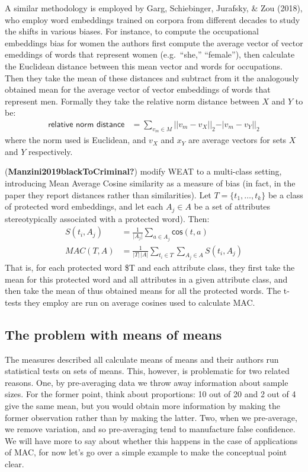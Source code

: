\documentclass[
  10pt,
  dvipsnames,enabledeprecatedfontcommands]{scrartcl}
\begin{document}
A similar methodology is employed by Garg, Schiebinger, Jurafsky, \& Zou
(2018), who employ word embeddings trained on corpora from different
decades to study the shifts in various biases. For instance, to compute
the occupational embeddings bias for women the authors first compute the
average vector of vector emeddings of words that represent women
(e.g.~``she,'' ``female''), then calculate the Euclidean distance
between this mean vector and words for occupations. Then they take the
mean of these distances and subtract from it the analogously obtained
mean for the average vector of vector embeddings of words that represent
men. Formally they take the relative norm distance between \(X\) and
\(Y\) to be: \begin{align}
\textsf{relative norm distance} & = \sum_{v_m\in M} \vert \vert v_m - v_X\vert \vert_2 - \vert v_m - v_Y\vert \vert_2
\end{align} \noindent where the norm used is Euclidean, and \(v_X\) and
\(x_Y\) are average vectors for sets \(X\) and \(Y\) respectively.

(\textbf{Manzini2019blackToCriminal?}) modify WEAT to a multi-class
setting, introducing Mean Average Cosine similarity as a measure of bias
(in fact, in the paper they report distances rather than similarities).
Let \(T = \{t_1, \dots, t_k\}\) be a class of protected word embeddings,
and let each \(A_j\in A\) be a set of attributes stereotypically
associated with a protected word). Then: \begin{align}
S(t_i, A_j) & = \frac{1}{\vert A_j\vert}\sum_{a\in A_j}\mathsf{cos}(t,a) \\
MAC(T,A) & = \frac{1}{\vert T \vert \,\vert A\vert}\sum_{t_i \in T }\sum_{A_j \in A} S(t_i,A_j)
\end{align} That is, for each protected word \$T and each attribute
class, they first take the mean for this protected word and all
attributes in a given attribute class, and then take the mean of thus
obtained means for all the protected words. The t-tests they employ are
run on average cosines used to calculate MAC.

\hypertarget{the-problem-with-means-of-means}{%
\subsection{The problem with means of
means}\label{the-problem-with-means-of-means}}

The measures described all calculate means of means and their authors
run statistical tests on sets of means. This, however, is problematic
for two related reasons. One, by pre-averaging data we throw away
information about sample sizes. For the former point, think about
proportions: 10 out of 20 and 2 out of 4 give the same mean, but you
would obtain more information by making the former observation rather
than by making the latter. Two, when we pre-average, we remove
variation, and so pre-averaging tend to manufacture false confidence. We
will have more to say about whether this happens in the case of
applications of MAC, for now let's go over a simple example to make the
conceptual point clear.
\end{document}
